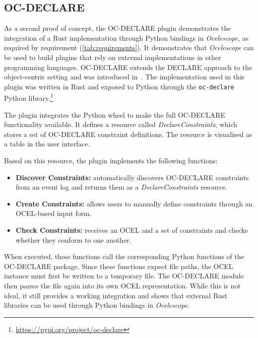 \subsection*{OC-DECLARE}

As a second proof of concept, the OC-DECLARE plugin demonstrates the integration of a Rust implementation through Python bindings in \textit{Ocelescope}, as required by requirement  (\autoref{tab:requirements}).
It demonstrates that \textit{Ocelescope} can be used to build plugins that rely on external implementations in other programming languages. OC-DECLARE extends the DECLARE approach to the object-centric setting and was introduced in~\cite{ocdeclare}. The implementation used in this plugin was written in Rust and exposed to Python through the \texttt{oc-declare} Python library.\footnote{\url{https://pypi.org/project/oc-declare}}

The plugin integrates the Python wheel to make the full OC-DECLARE functionality available. It defines a resource called \textit{DeclareConstraints}, which stores a set of OC-DECLARE constraint definitions. The resource is visualised as a table in the user interface.

Based on this resource, the plugin implements the following functions:

\begin{itemize}
	\item \textbf{Discover Constraints:} automatically discovers OC-DECLARE constraints from an event log and returns them as a \textit{DeclareConstraints} resource.
	\item \textbf{Create Constraints:} allows users to manually define constraints through an OCEL-based input form.
	\item \textbf{Check Constraints:} receives an OCEL and a set of constraints and checks whether they conform to one another.
\end{itemize}

When executed, these functions call the corresponding Python functions of the OC-DECLARE package.
Since these functions expect file paths, the OCEL instance must first be written to a temporary file.
The OC-DECLARE module then parses the file again into its own OCEL representation.
While this is not ideal, it still provides a working integration and shows that external Rust libraries can be used through Python bindings in \textit{Ocelescope}.
